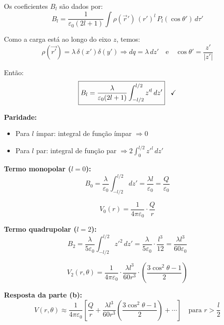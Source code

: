 \documentclass[a4paper,12pt]{article}
\begin{document}
\begin{flushleft}
Os coeficientes \( B_l \) são dados por:
\begin{equation}
B_l = \frac{1}{\varepsilon_0 (2l+1)} \int \rho(\vec{r}') \, (r')^l \, P_l(\cos\theta') \, d\tau'
\end{equation}

Como a carga está ao longo do eixo \( z \), temos:
\begin{equation}
\rho(\vec{r'}) = \lambda \, \delta(x') \delta(y') \Rightarrow dq = \lambda \, dz'
\quad \text{e} \quad \cos\theta' = \frac{z'}{|z'|}
\end{equation}

Então:
\begin{equation}
\boxed{
B_l = \frac{\lambda}{\varepsilon_0(2l+1)} \int_{-l/2}^{l/2} z'^l \, dz'
} \hspace{0.3cm} \checkmark
\end{equation}

\textbf{Paridade:}
\begin{itemize}
\item \colorbox{red!15}{Para \( l \) ímpar: integral de função ímpar \(\Rightarrow 0\)}
\item \colorbox{green!15}{Para \( l \) par: integral de função par \(\Rightarrow 2 \int_0^{l/2} z'^l \, dz'\)}
\end{itemize}

\vspace{0.3cm}
\noindent
\colorbox{green!15}{\textbf{Termo monopolar (\( l = 0 \)):}}
\begin{equation}
B_0 = \frac{\lambda}{\varepsilon_0} \int_{-l/2}^{l/2} dz' = \frac{\lambda l}{\varepsilon_0} = \frac{Q}{\varepsilon_0}
\end{equation}

\begin{equation}
V_0(r) = \frac{1}{4\pi\varepsilon_0} \cdot \frac{Q}{r}
\end{equation}

\vspace{0.3cm}
\noindent
\colorbox{green!15}{\textbf{Termo quadrupolar (\( l = 2 \)):}}
\begin{equation}
B_2 = \frac{\lambda}{5\varepsilon_0} \int_{-l/2}^{l/2} z'^2 \, dz' = \frac{\lambda}{5\varepsilon_0} \cdot \frac{l^3}{12}
= \frac{\lambda l^3}{60\varepsilon_0}
\end{equation}

\begin{equation}
V_2(r, \theta) = \frac{1}{4\pi\varepsilon_0} \cdot \frac{\lambda l^3}{60 r^3} \cdot \left( \frac{3\cos^2\theta - 1}{2} \right)
\end{equation}

\vspace{0.3cm}
\noindent
\textbf{Resposta da parte (b):}
\begin{equation}
\boxed{
V(r, \theta) \approx \frac{1}{4\pi\varepsilon_0} \left[
\frac{Q}{r} +
\frac{\lambda l^3}{60 r^3} \left( \frac{3\cos^2\theta - 1}{2} \right)
+ \cdots
\right]
\quad \text{para } r > \frac{l}{2}
}
\end{equation}

\end{flushleft}
\end{document}
